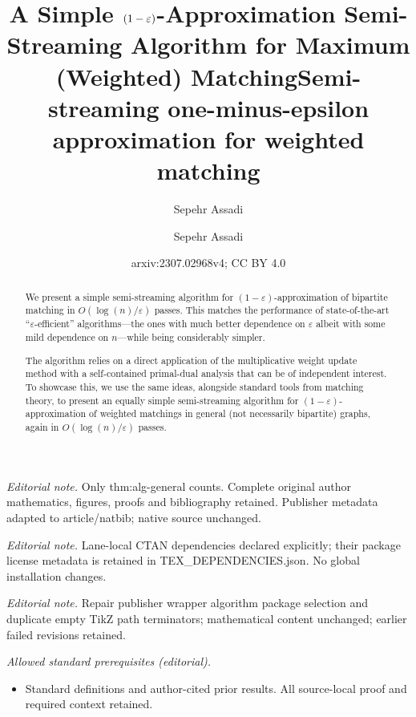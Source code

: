 \documentclass{article}
\title{A Simple \texorpdfstring{$(1-\eps)$}{(1-eps)}-Approximation Semi-Streaming Algorithm for Maximum (Weighted) Matching} %
\author{Sepehr Assadi}\date{}
\title{Semi-streaming one-minus-epsilon approximation for weighted matching}
\author{Sepehr Assadi}
\date{arxiv:2307.02968v4; CC BY 4.0}
\newcommand{\eps}{\varepsilon}
\begin{document}
\maketitle
\noindent\textit{Editorial note.} Only thm:alg-general counts. Complete original author mathematics, figures, proofs and bibliography retained. Publisher metadata adapted to article/natbib; native source unchanged.\par\medskip
\noindent\textit{Editorial note.} Lane-local CTAN dependencies declared explicitly; their package license metadata is retained in TEX\_DEPENDENCIES.json. No global installation changes.\par\medskip
\noindent\textit{Editorial note.} Repair publisher wrapper algorithm package selection and duplicate empty TikZ path terminators; mathematical content unchanged; earlier failed revisions retained.\par\medskip
\noindent\textit{Allowed standard prerequisites (editorial).}\begin{itemize}
\item Standard definitions and author-cited prior results. All source-local proof and required context retained.
\end{itemize}\medskip
\maketitle




\begin{abstract}


	We present a simple semi-streaming algorithm for $(1-\eps)$-approximation of bipartite matching in $O(\log{\!(n)}/\eps)$ passes. This 
	matches the performance of state-of-the-art ``$\eps$-efficient'' algorithms---the ones with much better dependence on  $\eps$ albeit with some mild dependence on $n$---while being considerably simpler. 
	
	
	The algorithm relies on a direct application of the multiplicative weight update method with a self-contained primal-dual analysis that can be of  independent interest. 
	To showcase this, we use the same ideas, alongside standard tools from matching  theory, to present an equally simple semi-streaming algorithm for $(1-\eps)$-approximation of weighted matchings in general (not necessarily bipartite) 
	graphs, again in $O(\log{\!(n)}/\eps)$ passes. 
\end{abstract}
\end{document}
